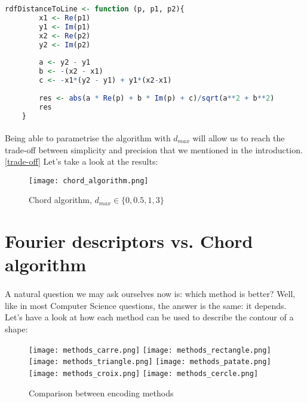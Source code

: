 \begin{lstlisting}[language=R, caption=Distance from a point to a line]
    rdfDistanceToLine <- function (p, p1, p2){
        x1 <- Re(p1)
        y1 <- Im(p1)
        x2 <- Re(p2)
        y2 <- Im(p2)
        
        a <- y2 - y1
        b <- -(x2 - x1)
        c <- -x1*(y2 - y1) + y1*(x2-x1)
        
        res <- abs(a * Re(p) + b * Im(p) + c)/sqrt(a**2 + b**2)
        res
    }
\end{lstlisting}

\clearpage

\paragraph{}
Being able to parametrise the algorithm with $d_{max}$ will allow us to reach the trade-off between simplicity and precision that we mentioned in the introduction.\ref{trade-off}
Let's take a look at the results:
\begin{figure}[ht]
    \centering
    \texttt{[image: chord\_algorithm.png]}
    \caption{Chord algorithm, $d_{max} \in \{0, 0.5, 1, 3\}$}
\end{figure}

\clearpage

\section{Fourier descriptors vs. Chord algorithm}
\paragraph{}
A natural question we may ask ourselves now is: which method is better?
Well, like in most Computer Science questions, the answer is the same: it depends.
Let's have a look at how each method can be used to describe the contour of a shape:

\begin{figure}[ht]
    \centering
    \texttt{[image: methods\_carre.png]}
    \texttt{[image: methods\_rectangle.png]}
    \texttt{[image: methods\_triangle.png]}
    \texttt{[image: methods\_patate.png]}
    \texttt{[image: methods\_croix.png]}
    \texttt{[image: methods\_cercle.png]}
    \caption{Comparison between encoding methods}
    \label{methods-comparison}
\end{figure}


